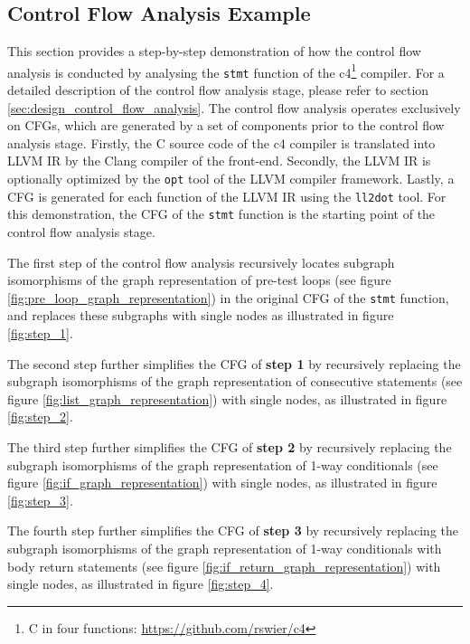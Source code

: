 
\subsection{Control Flow Analysis Example}
\label{app:control_flow_analysis_example}

This section provides a step-by-step demonstration of how the control flow analysis is conducted by analysing the \texttt{stmt} function of the c4\footnote{C in four functions: \url{https://github.com/rswier/c4}} compiler. For a detailed description of the control flow analysis stage, please refer to section \ref{sec:design_control_flow_analysis}. The control flow analysis operates exclusively on CFGs, which are generated by a set of components prior to the control flow analysis stage. Firstly, the C source code of the c4 compiler is translated into LLVM IR by the Clang compiler of the front-end. Secondly, the LLVM IR is optionally optimized by the \texttt{opt} tool of the LLVM compiler framework. Lastly, a CFG is generated for each function of the LLVM IR using the \texttt{ll2dot} tool. For this demonstration, the CFG of the \texttt{stmt} function is the starting point of the control flow analysis stage.

The first step of the control flow analysis recursively locates subgraph isomorphisms of the graph representation of pre-test loops (see figure \ref{fig:pre_loop_graph_representation}) in the original CFG of the \texttt{stmt} function, and replaces these subgraphs with single nodes as illustrated in figure \ref{fig:step_1}.

The second step further simplifies the CFG of \textbf{step 1} by recursively replacing the subgraph isomorphisms of the graph representation of consecutive statements (see figure \ref{fig:list_graph_representation}) with single nodes, as illustrated in figure \ref{fig:step_2}.

The third step further simplifies the CFG of \textbf{step 2} by recursively replacing the subgraph isomorphisms of the graph representation of 1-way conditionals (see figure \ref{fig:if_graph_representation}) with single nodes, as illustrated in figure \ref{fig:step_3}.

The fourth step further simplifies the CFG of \textbf{step 3} by recursively replacing the subgraph isomorphisms of the graph representation of 1-way conditionals with body return statements (see figure \ref{fig:if_return_graph_representation}) with single nodes, as illustrated in figure \ref{fig:step_4}.

